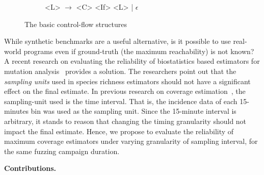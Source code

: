 \documentclass[conference]{IEEEtran}
\begin{document}
\begin{figure*}
\begin{subfigure}[h]{0.3\textwidth}
\begin{grammar}
  <L> $\rightarrow$ <C> <If> <L> | $\epsilon$
  
\end{grammar}

\end{subfigure}

\caption{The basic control-flow structures}
\label{fig:cfg}
\end{figure*}

While synthetic benchmarks are a useful alternative, is it possible to use
real-world programs even if ground-truth (the maximum reachability) is not
known? A recent research on evaluating the reliability of biostatistics based
estimators for mutation analysis~\cite{Kuznetsov2024empirical} provides a
solution. The researchers point out that the \emph{sampling units} used in
species richness estimators should not have a significant effect on the final
estimate. In previous research on coverage estimation~\cite{liyanage2023reachable},
the sampling-unit used is the time interval. That is, the incidence data of
each 15-minutes bin was used as the sampling unit. Since the 15-minute interval
is arbitrary, it stands to reason that changing the timing granularity should
not impact the final estimate. Hence, we propose to evaluate the reliability of
maximum coverage estimators under varying granularity of sampling interval,
for the same fuzzing campaign duration.



\noindent{}\textbf{Contributions.}
\end{document}

